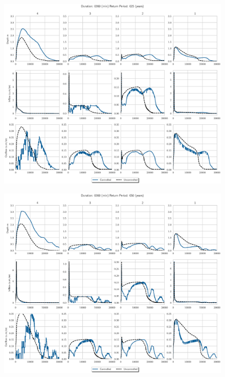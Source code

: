 \begin{figure}
    \centering
    \includegraphics[width=\linewidth]{./RL-SI-figures/77storms/0360025.eps}
\end{figure}
\begin{figure}
    \centering
    \includegraphics[width=\linewidth]{./RL-SI-figures/77storms/0360050.eps}
\end{figure}

